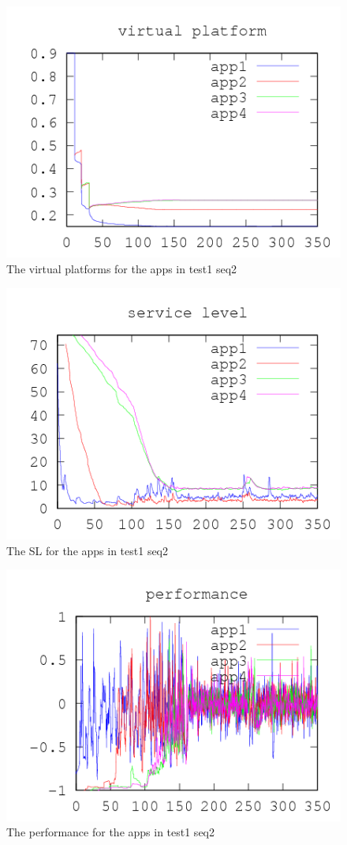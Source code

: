 \documentclass[nobiblatex]{LTHthesis}
\begin{document}
\begin{figure}[!H]
  \centering
  \includegraphics{"tools/plot/logs/test1/vp"}
  \caption{The virtual platforms for the apps in test1 seq2}
  \label{fig:test1_vp}
\end{figure}

\begin{figure}[!H]
  \centering
  \includegraphics{"tools/plot/logs/test1/sl"}
  \caption{The SL for the apps in test1 seq2}
  \label{fig:test1_sl}
\end{figure}

\begin{figure}[!H]
  \centering
  \includegraphics{"tools/plot/logs/test1/f"}
  \caption{The performance for the apps in test1 seq2}
  \label{fig:test1_f}
\end{figure}
\end{document}
